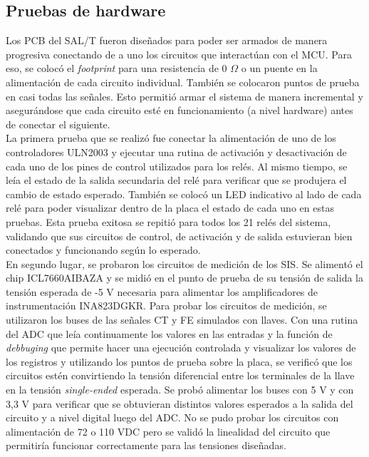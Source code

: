 \subsection{Pruebas de hardware}

Los PCB del SAL/T fueron diseñados para poder ser armados de manera progresiva conectando de a uno los circuitos que interactúan con el MCU. Para eso, se colocó el \textit{footprint} para una resistencia de 0 $\Omega$ o un puente en la alimentación de cada circuito individual. También se colocaron puntos de prueba en casi todas las señales. Esto permitió armar el sistema de manera incremental y asegurándose que cada circuito esté en funcionamiento (a nivel hardware) antes de conectar el siguiente.  \\ 

La primera prueba que se realizó fue conectar la alimentación de uno de los controladores ULN2003 y ejecutar una rutina de activación y desactivación de cada uno de los pines de control utilizados para los relés. Al mismo tiempo, se leía el estado de la salida secundaria del relé para verificar que se produjera el cambio de estado esperado. También se colocó un LED indicativo al lado de cada relé para poder visualizar dentro de la placa el estado de cada uno en estas pruebas. Esta prueba exitosa se repitió para todos los 21 relés del sistema, validando que sus circuitos de control, de activación y de salida estuvieran bien conectados y funcionando según lo esperado. \\ 

En segundo lugar, se probaron los circuitos de medición de los SIS. Se alimentó el chip ICL7660AIBAZA y se midió en el punto de prueba de su tensión de salida la tensión esperada de -5 V necesaria para alimentar los amplificadores de instrumentación INA823DGKR. Para probar los circuitos de medición, se utilizaron los buses de las señales CT y FE simulados con llaves. Con una rutina del ADC que leía continuamente los valores en las entradas y la función de \textit{debbuging} que permite hacer una ejecución controlada y visualizar los valores de los registros y utilizando los puntos de prueba sobre la placa, se verificó que los circuitos estén convirtiendo la tensión diferencial entre los terminales de la llave en la tensión \textit{single-ended} esperada. Se probó alimentar los buses con 5 V y con 3,3 V para verificar que se obtuvieran distintos valores esperados a la salida del circuito y a nivel digital luego del ADC. No se pudo probar los circuitos con alimentación de 72 o 110 VDC pero se validó la linealidad del circuito que permitiría funcionar correctamente para las tensiones diseñadas. \\ 


